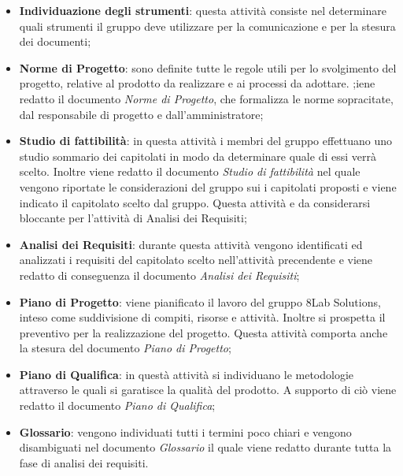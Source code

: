 \begin{itemize}
	\item \textbf{Individuazione degli strumenti}: questa attività consiste nel 
	determinare quali strumenti il gruppo deve utilizzare per la comunicazione 
	e per la stesura dei documenti; 
	\item \textbf{Norme di Progetto}: sono definite tutte le regole utili per lo svolgimento del progetto, relative al prodotto da realizzare e ai processi da adottare. ;iene redatto il documento \textit{Norme 
	di Progetto}, che formalizza le norme sopracitate, dal responsabile di progetto e dall'amministratore;
	\item \textbf{Studio di fattibilità}: in questa attività i membri del gruppo effettuano uno studio sommario dei capitolati in modo da determinare quale di essi verrà scelto. Inoltre viene redatto il documento 
	\textit{Studio di fattibilità} nel quale vengono riportate le considerazioni del gruppo sui i capitolati proposti e viene indicato il capitolato scelto dal gruppo. 
	Questa attività e da considerarsi bloccante per l'attività di Analisi dei 
	Requisiti;
	\item \textbf{Analisi dei Requisiti}: durante questa attività vengono 
	identificati ed analizzati i requisiti del capitolato scelto nell'attività 
	precendente e viene redatto di conseguenza il documento \textit{Analisi dei 
	Requisiti};
	\item \textbf{Piano di Progetto}: viene pianificato il 
	lavoro del gruppo 8Lab Solutions, inteso come suddivisione di compiti, 
	risorse e attività. Inoltre si prospetta il preventivo per la realizzazione 
	del progetto. Questa attività comporta anche la stesura 
	del documento \textit{Piano di Progetto};
	\item \textbf{Piano di Qualifica}: in questà attività si individuano le 
	metodologie attraverso le quali si garatisce la qualità del prodotto. A supporto di ciò viene redatto il documento \textit{Piano di Qualifica}; 
	\item \textbf{Glossario}: vengono individuati tutti i termini poco chiari e 
	vengono disambiguati nel documento \textit{Glossario} il quale viene 
	redatto durante tutta la fase di analisi dei requisiti.
\end{itemize}

